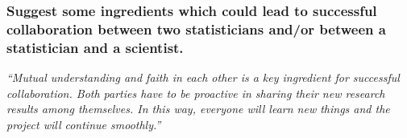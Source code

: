 \documentclass[12pt]{beamer}
\newcommand\ans[1]{{\it ``#1''}}
\begin{document}
\begin{frame} %
\frametitle{Suggest some ingredients which could lead to successful collaboration between two statisticians and/or between a statistician and a scientist.}


\ans{Mutual understanding and faith in each other is a key ingredient for successful collaboration.  Both parties have to be proactive in sharing their new research results among themselves.  In this way, everyone will learn new things and the project will continue smoothly.}










\end{frame} 
\end{document}
